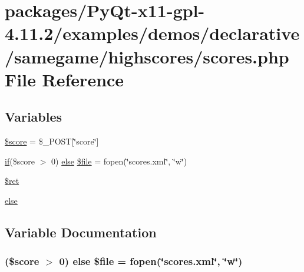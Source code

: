 \hypertarget{scores_8php}{}\section{packages/\+Py\+Qt-\/x11-\/gpl-\/4.11.2/examples/demos/declarative/samegame/highscores/scores.php File Reference}
\label{scores_8php}
\subsection*{Variables}
\begin{DoxyCompactItemize}
\item 
\hyperlink{scores_8php_aa021b2590868740e2d52762711ea145f}{\$score} = \$\+\_\+\+P\+O\+S\+T\mbox{[}\char`\"{}score\char`\"{}\mbox{]}
\item 
\hyperlink{minmax_8h_a30a0ee9fee303f01d9c5e6f669e0dfe9}{if}(\$score $>$ 0) \hyperlink{scores_8php_a0544c3fe466e421738dae463968b70ba}{else} \hyperlink{scores_8php_a4791e4b628a74d884844e7c3c9457710}{\$file} = fopen(\char`\"{}scores.\+xml\char`\"{}, \char`\"{}w\char`\"{})
\item 
\hyperlink{scores_8php_affd9e3eb0aad0a7ca42912cd925f148c}{\$ret}
\item 
\hyperlink{scores_8php_a0544c3fe466e421738dae463968b70ba}{else}
\end{DoxyCompactItemize}


\subsection{Variable Documentation}
\hypertarget{scores_8php_a4791e4b628a74d884844e7c3c9457710}{}
\subsubsection[{\$file}]{ (\$score $>$ 0) {\bf else} \$file = fopen(\char`\"{}scores.\+xml\char`\"{}, \char`\"{}w\char`\"{})}\label{scores_8php_a4791e4b628a74d884844e7c3c9457710}
\hypertarget{scores_8php_affd9e3eb0aad0a7ca42912cd925f148c}{}
